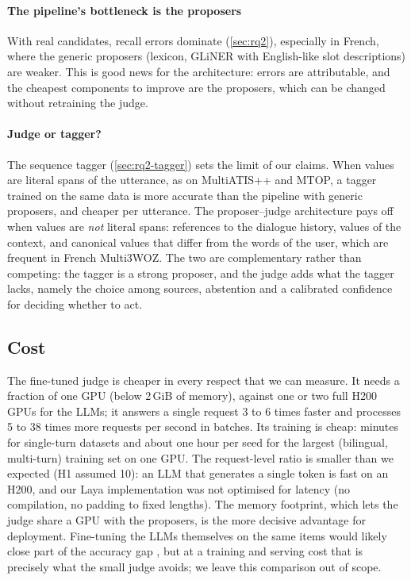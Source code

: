 \paragraph{The pipeline's bottleneck is the proposers} With real candidates, recall errors dominate (\cref{sec:rq2}), especially in French, where the generic proposers (lexicon, GLiNER with English-like slot descriptions) are weaker. This is good news for the architecture: errors are attributable, and the cheapest components to improve are the proposers, which can be changed without retraining the judge.

\paragraph{Judge or tagger?} The sequence tagger (\cref{sec:rq2-tagger}) sets the limit of our claims. When values are literal spans of the utterance, as on MultiATIS++ and MTOP, a tagger trained on the same data is more accurate than the pipeline with generic proposers, and cheaper per utterance. The proposer--judge architecture pays off when values are \emph{not} literal spans: references to the dialogue history, values of the context, and canonical values that differ from the words of the user, which are frequent in French Multi3WOZ. The two are complementary rather than competing: the tagger is a strong proposer, and the judge adds what the tagger lacks, namely the choice among sources, abstention and a calibrated confidence for deciding whether to act.

\subsection{Cost}
\label{sec:cost}

The fine-tuned judge is cheaper in every respect that we can measure. It needs a fraction of one GPU (below 2\,GiB of memory), against one or two full H200 GPUs for the LLMs; it answers a single request 3 to 6 times faster and processes 5 to 38 times more requests per second in batches. Its training is cheap: minutes for single-turn datasets and about one hour per seed for the largest (bilingual, multi-turn) training set on one GPU. The request-level ratio is smaller than we expected (H1 assumed 10): an LLM that generates a single token is fast on an H200, and our Laya implementation was not optimised for latency (no compilation, no padding to fixed lengths). The memory footprint, which lets the judge share a GPU with the proposers, is the more decisive advantage for deployment. Fine-tuning the LLMs themselves on the same items would likely close part of the accuracy gap \citep{aguirre2025finetuning}, but at a training and serving cost that is precisely what the small judge avoids; we leave this comparison out of scope.

